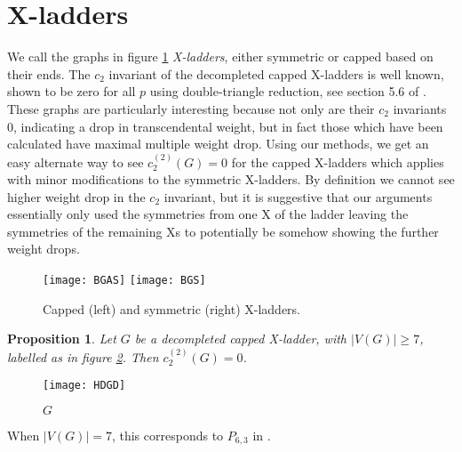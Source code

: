 \documentclass[12pt]{amsart}
\newtheorem{proposition}[definition]{Proposition}
\numberwithin{definition}{section}
\begin{document}
\section{X-ladders}\label{sec xladder}
We call the graphs in figure \ref{fig X ladder} \textit{X-ladders}, either symmetric or capped based on their ends. The $c_2$ invariant of the decompleted capped X-ladders is well known, shown to be zero for all $p$ using double-triangle reduction, see section 5.6 of \cite{PanzerSchnetz2016}.  These graphs are particularly interesting because not only are their $c_2$ invariants $0$, indicating a drop in transcendental weight, but in fact those which have been calculated have maximal multiple weight drop.
Using our methods, we get an easy alternate way to see $c_2^{(2)}(G)=0$ for the capped X-ladders which applies with minor modifications to the symmetric X-ladders. By definition we cannot see higher weight drop in the $c_2$ invariant, but it is suggestive that our arguments essentially only used the symmetries from one X of the ladder leaving the symmetries of the remaining Xs to potentially be somehow showing the further weight drops.\\
\begin{figure}[h]
\texttt{[image: BGAS]} \qquad
\texttt{[image: BGS]}
\caption{Capped (left) and symmetric (right) X-ladders.}\label{fig X ladder}
\end{figure}
\begin{proposition}
	Let $G$ be a decompleted capped X-ladder, with $|V(G)|\geq 7$, labelled as in figure \ref{fig anti X}. Then $c_2^{(2)}(G)=0$. \\
\end{proposition}

\begin{figure}[h]
		\texttt{[image: HDGD]}
		\caption{$G$}\label{fig anti X}
\end{figure}

When $|V(G)|=7$, this corresponds to $P_{6,3}$ in \cite{Schnetz2010}. \\
\end{document}
